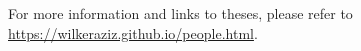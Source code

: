 \begin{center}
\begin{tabular}{l p{} r }
\end{tabular}
\end{center}

For more information and links to theses, please refer to \url{https://wilkeraziz.github.io/people.html}.









